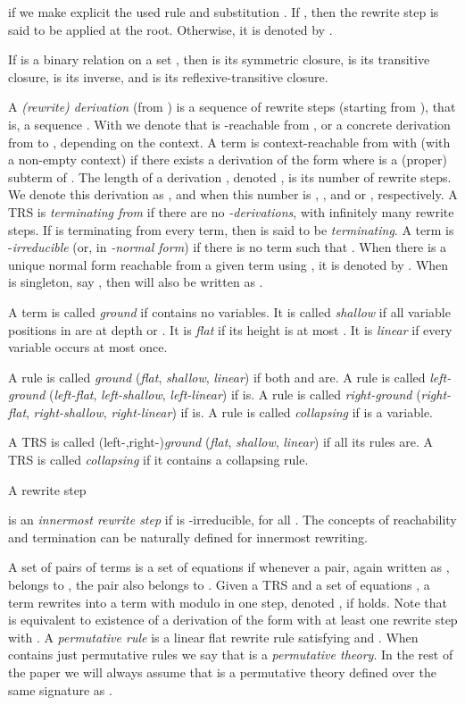 \documentclass{LMCS}
\theoremstyle{plain}
\begin{document}
if we make explicit the used rule 
and substitution .
If , then the rewrite step 
is said to be applied at the root.
Otherwise, it is denoted by .

If  is a binary relation on a set , then
 is its symmetric closure,
 is its transitive
closure,  is its inverse, and
 is its reflexive-transitive closure.

A \emph{(rewrite) derivation} (from ) is a sequence of
rewrite steps (starting from ), that is, a sequence
. With  we
denote that  is -reachable from , or a concrete derivation
from  to , depending on the context.
A term  is context-reachable from  with  (with a non-empty
context) if
there exists a derivation of the form  where
 is a (proper) subterm of .
The length of a derivation , denoted
, is its number of rewrite steps.
We denote this derivation as , 
and  when this number is , , and
 or , respectively.
A TRS  is {\em terminating from }
if there are no {\em -derivations},
 with infinitely
many rewrite steps.
If  is terminating from every term, then  is 
said to be {\em terminating}.
A term  is -\emph{irreducible} (or, in {\em -normal form}) 
if there is no term 
 such that .
When there is a unique normal form reachable from a given term
 using , it is denoted by .
When  is singleton, say , then
 will also be written as .


A term  is called {\em ground} if  contains no variables.
It is called {\em shallow} if all variable positions in  are
at depth  or .
It is {\em flat} if its height is at most .
It is {\em linear} if every variable occurs at most once.



A rule  is called {\em ground} ({\em flat}, {\em shallow},
{\em linear})
if both  and  are. A rule  is called
{\em left-ground} ({\em left-flat}, {\em left-shallow}, {\em
left-linear}) if  is.
A rule  is called
{\em right-ground} ({\em right-flat}, {\em right-shallow},
{\em right-linear}) if  is.
A rule  is called {\em collapsing} if  is a variable.

A TRS  is called (left-,right-){\em ground} ({\em flat}, {\em shallow},
{\em linear}) if all its rules are. A TRS  is called {\em collapsing}
if it contains a collapsing rule.

A rewrite step

is an {\em innermost rewrite step} if
 is -irreducible, for all .
The concepts of reachability and termination
can be naturally defined for innermost
rewriting.

A set  of pairs of terms is a set of equations if
whenever a pair, again written as , belongs to , 
the pair  also belongs to .
Given a TRS  and a set of equations ,
a term  rewrites into a term  with  modulo  in one step,
denoted , if  holds.
Note that  is equivalent to existence
of a derivation of the form  with
at least one rewrite step with .
A {\em permutative rule} is a linear flat rewrite rule 
satisfying  and .
When  contains just permutative rules we say that 
is a {\em permutative theory}.
In the rest of the paper
we will always assume that  is a permutative theory
defined over the same signature as .
\end{document}
